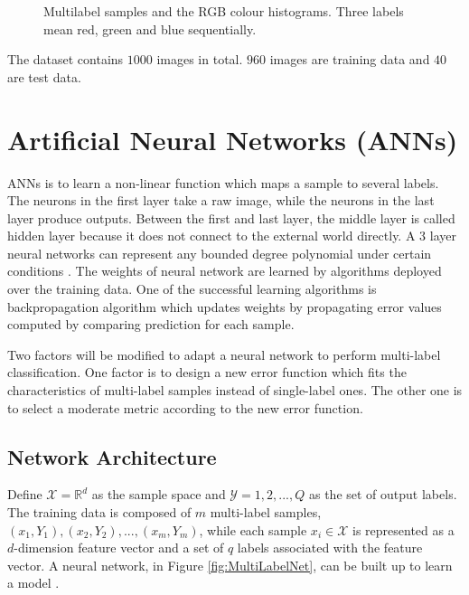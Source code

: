\begin{figure}[!htb]
\caption{Multilabel samples and the RGB colour histograms. Three labels mean red, green and blue sequentially. }
\end{figure}

The dataset contains $1000$ images in total. $960$ images are training data and $40$ are test data. 

\section{Artificial Neural Networks (ANNs)}

ANNs is to learn a non-linear function which maps a sample to several labels. The neurons in the first layer take a raw image, while the neurons in the last layer produce outputs. Between the first and last layer, the middle layer is called hidden layer because it does not connect to the external world directly. A 3 layer neural networks can represent any bounded degree polynomial under certain conditions \citep{barron1993universal}. The weights of neural network are learned by algorithms deployed over the training data. One of the successful learning algorithms is backpropagation algorithm which updates weights by propagating error values computed by comparing prediction for each sample.

Two factors will be modified to adapt a neural network to perform multi-label classification. One factor is to design a new error function which fits the characteristics of multi-label samples instead of single-label ones. The other one is to select a moderate metric according to the new error function.

\subsection{Network Architecture}

Define $\mathcal{X} = \mathbb{R}^{d}$ as the sample space and $\mathcal{Y} = {1,2,...,Q}$ as the set of output labels. The training data is composed of $m$ multi-label samples, ${(x_{1}, Y_{1}),(x_{2}, Y_{2}),...,(x_{m}, Y_{m})}$, while each sample $x_{i} \in \mathcal{X}$ is represented as a $d$-dimension feature vector and a set of $q$ labels associated with the feature vector. A neural network, in Figure \ref{fig:MultiLabelNet}, can be built up to learn a model .

